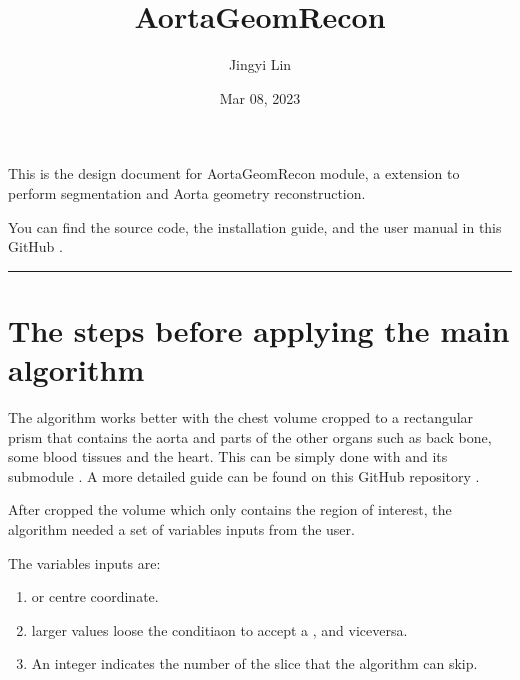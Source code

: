 \documentclass[letterpaper,10pt,english]{sphinxmanual}
\title{AortaGeomRecon}
\date{Mar 08, 2023}
\author{Jingyi Lin}
\begin{document}
\pagestyle{empty}
\sphinxmaketitle
\pagestyle{plain}
\sphinxtableofcontents
\pagestyle{normal}
\label{\detokenize{index::doc}}


\sphinxAtStartPar
This is the design document for AortaGeomRecon module, a {\hyperref[\detokenize{glossary:term-3D-Slicer}]{}} extension to perform {\hyperref[\detokenize{glossary:term-Aorta}]{}} segmentation and Aorta geometry reconstruction.

\sphinxAtStartPar
You can find the source code, the installation guide, and the user manual in this GitHub .


\bigskip\hrule\bigskip



\chapter{The steps before applying the main algorithm}
\label{\detokenize{index:the-steps-before-applying-the-main-algorithm}}
\sphinxAtStartPar
The algorithm works better with the chest volume cropped to a rectangular prism that contains the aorta and parts of the other organs such as back bone, some blood tissues and the heart. This can be simply done with {\hyperref[\detokenize{glossary:term-3D-Slicer}]{}} and its submodule . A more detailed guide can be found on this GitHub repository .

\sphinxAtStartPar
After cropped the volume which only contains the region of interest, the algorithm needed a set of variables inputs from the user.

\sphinxAtStartPar
The variables inputs are:
\begin{enumerate}
%
\item {} 
\sphinxAtStartPar
{\hyperref[\detokenize{glossary:term-Descending-Aorta}]{}} or {\hyperref[\detokenize{glossary:term-Ascending-Aorta}]{}} centre coordinate.

\item {} 
\sphinxAtStartPar
{\hyperref[\detokenize{glossary:term-Qualified-coefficient}]{}} larger values loose the conditiaon to accept a {\hyperref[\detokenize{glossary:term-segmented}]{}} {\hyperref[\detokenize{glossary:term-slice}]{}}, and vice\sphinxhyphen{}versa.

\item {} 
\sphinxAtStartPar
An integer indicates the number of the slice that the algorithm can skip.

\end{enumerate}
\end{document}
